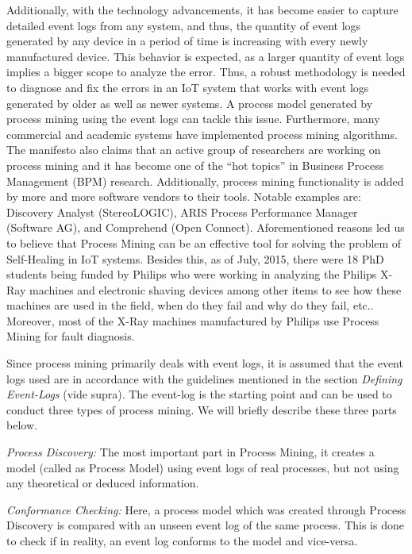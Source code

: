 Additionally, with the technology advancements, it has become easier to capture detailed event logs from any system, and thus, the quantity of event logs generated by any device in a period of time is increasing with every newly manufactured device. This behavior is expected, as a larger quantity of event logs implies a bigger scope to analyze the error. Thus, a robust methodology is needed to diagnose and fix the errors in an IoT system that works with event logs generated by older as well as newer systems. A process model generated by process mining using the event logs can tackle this issue. Furthermore, many commercial and academic systems have implemented process mining algorithms. The manifesto\cite{Vossen2012} also claims that an active group of researchers are working on process mining and it has become one of the “hot topics” in Business Process Management (BPM) research. Additionally, process mining functionality is added by more and more software vendors to their tools. Notable examples are: Discovery Analyst (StereoLOGIC), ARIS Process Performance Manager (Software AG), and Comprehend (Open Connect). Aforementioned reasons led us to believe that Process Mining can be an effective tool for solving the problem of Self-Healing in IoT systems. Besides this, as of July, 2015, there were 18 PhD students being funded by Philips who were working in analyzing the Philips X-Ray machines and electronic shaving devices among other items to see how these machines are used in the field, when do they fail and why do they fail, etc.\cite{Aalst2015}. Moreover, most of the X-Ray machines manufactured by Philips use Process Mining for fault diagnosis\cite{VanDerAalst2012a,Vossen2012}.

Since process mining primarily deals with event logs, it is assumed that the event logs used are in accordance with the guidelines mentioned in the section \textit{Defining Event-Logs} (vide supra). The event-log is the starting point and can be used to conduct three types of process mining. We will briefly describe these three parts below.

\textit{Process Discovery:} The most important part in Process Mining, it creates a model (called as Process Model) using event logs of real processes, but not using any theoretical or deduced information. 

\textit{Conformance Checking:} Here, a process model which was created through Process Discovery is compared with an unseen event log of the same process. This is done to check if in reality, an event log conforms to the model and vice-versa.


